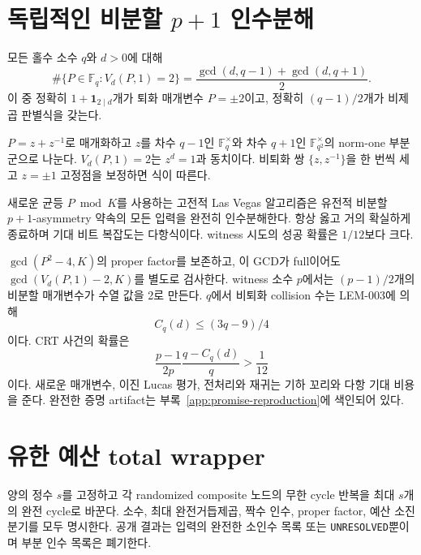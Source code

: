 \documentclass[11pt]{article}
\begin{document}
\section{독립적인 비분할 \texorpdfstring{\(p+1\)}{p+1} 인수분해}

{}
모든 홀수 소수 \(q\)와 \(d>0\)에 대해
\[
\#\{P\in\mathbb F_q:V_d(P,1)=2\}
=\frac{\gcd(d,q-1)+\gcd(d,q+1)}2.
\]
이 중 정확히 \(1+\mathbf1_{2\mid d}\)개가 퇴화 매개변수 \(P=\pm2\)이고,
정확히 \((q-1)/2\)개가 비제곱 판별식을 갖는다.

\begin{claimproof}
\(P=z+z^{-1}\)로 매개화하고 \(z\)를 차수 \(q-1\)인
\(\mathbb F_q^\times\)와 차수 \(q+1\)인
\(\mathbb F_{q^2}^\times\)의 norm-one 부분군으로 나눈다.
\(V_d(P,1)=2\)는 \(z^d=1\)과 동치이다. 비퇴화 쌍
\(\{z,z^{-1}\}\)을 한 번씩 세고 \(z=\pm1\) 고정점을 보정하면 식이
따른다.
\end{claimproof}

{}
새로운 균등 \(P\bmod K\)를 사용하는
고전적 Las Vegas 알고리즘은 유전적 비분할 \(p+1\)-asymmetry 약속의
모든 입력을 완전히 인수분해한다. 항상 옳고 거의 확실하게 종료하며
기대 비트 복잡도는 다항식이다. witness 시도의 성공 확률은
\(1/12\)보다 크다.

\begin{claimproof}
\(\gcd(P^2-4,K)\)의 proper factor를 보존하고, 이 GCD가 full이어도
\(\gcd(V_d(P,1)-2,K)\)를 별도로 검사한다. witness 소수 \(p\)에서는
\((p-1)/2\)개의 비분할 매개변수가 수열 값을 2로 만든다. \(q\)에서
비퇴화 collision 수는 LEM-003에 의해
\[
C_q(d)\le(3q-9)/4
\]
이다. CRT 사건의 확률은
\[
\frac{p-1}{2p}\frac{q-C_q(d)}q>\frac1{12}
\]
이다. 새로운 매개변수, 이진 Lucas 평가, 전처리와 재귀는 기하 꼬리와
다항 기대 비용을 준다. 완전한 증명 artifact는
부록~\ref{app:promise-reproduction}에 색인되어 있다.
\end{claimproof}

\section{유한 예산 total wrapper}

양의 정수 \(s\)를 고정하고 각 randomized composite 노드의 무한 cycle
반복을 최대 \(s\)개의 완전 cycle로 바꾼다. 소수, 최대
완전거듭제곱, 짝수 인수, proper factor, 예산 소진 분기를 모두
명시한다. 공개 결과는 입력의 완전한 소인수 목록 또는
\texttt{UNRESOLVED}뿐이며 부분 인수 목록은 폐기한다.
\end{document}
